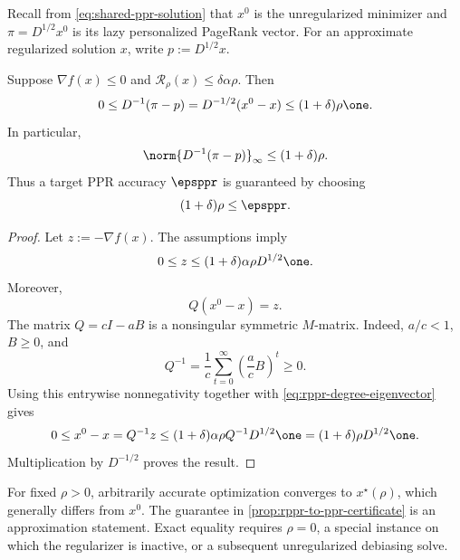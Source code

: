 Recall from \cref{eq:shared-ppr-solution} that \(x^0\) is the
unregularized minimizer and \(\pi=D^{1/2}x^0\) is its lazy personalized
PageRank vector.  For an approximate regularized solution \(x\), write
\(p:=D^{1/2}x\).

\begin{proposition}
\label{prop:rppr-to-ppr-certificate}
Suppose \(\nabla f(x)\leq0\) and
\(\mathcal{R}_\rho(x)\leq\delta\alpha\rho\).  Then
\begin{equation}
    0
    \leq
    D^{-1}(\pi-p)
    =D^{-1/2}(x^0-x)
    \leq
    (1+\delta)\rho\one.
    \label{eq:rppr-to-ppr-coordinate-bound}
\end{equation}
In particular,
\begin{equation}
    \norm{D^{-1}(\pi-p)}_\infty
    \leq(1+\delta)\rho.
    \label{eq:rppr-to-ppr-infinity-bound}
\end{equation}
Thus a target PPR accuracy \(\epsppr\) is guaranteed by
choosing
\begin{equation}
    (1+\delta)\rho\leq\epsppr.
    \label{eq:rppr-rho-delta-choice}
\end{equation}
\end{proposition}

\begin{proof}
Let \(z:=-\nabla f(x)\).  The assumptions imply
\[
    0\leq z\leq(1+\delta)\alpha\rho D^{1/2}\one.
\]
Moreover,
\[
    Q(x^0-x)=z.
\]
The matrix \(Q=cI-aB\) is a nonsingular symmetric \(M\)-matrix.  Indeed,
\(a/c<1\), \(B\geq0\), and
\[
    Q^{-1}
    =
    \frac1c\sum_{t=0}^{\infty}\left(\frac ac B\right)^t
    \geq0.
\]
Using this entrywise nonnegativity together with
\cref{eq:rppr-degree-eigenvector} gives
\[
    0
    \leq x^0-x
    =Q^{-1}z
    \leq
    (1+\delta)\alpha\rho Q^{-1}D^{1/2}\one
    =(1+\delta)\rho D^{1/2}\one.
\]
Multiplication by \(D^{-1/2}\) proves the result.
\end{proof}

\begin{remark}
\label{rem:rppr-not-exact-ppr}
For fixed \(\rho>0\), arbitrarily accurate optimization converges to
\(x^\star(\rho)\), which generally differs from \(x^0\).  The guarantee
in \cref{prop:rppr-to-ppr-certificate} is an approximation statement.  Exact
equality requires \(\rho=0\), a special instance on which the regularizer is
inactive, or a subsequent unregularized debiasing solve.
\end{remark}

